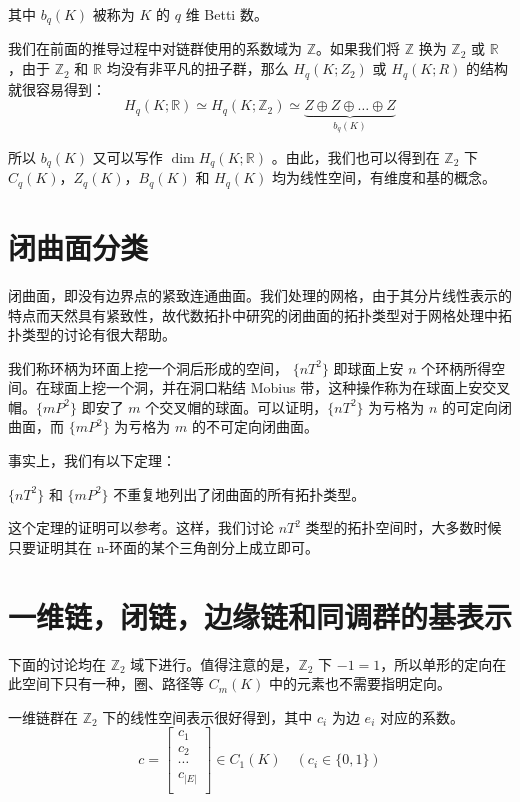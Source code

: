 其中 $ b_q(K) $ 被称为 $ K $ 的 $ q $ 维 Betti 数。

我们在前面的推导过程中对链群使用的系数域为 $ \mathbb Z $。如果我们将 $ \mathbb{Z} $ 换为 $ \mathbb{Z}_2 $ 或 $ \mathbb{R} $，由于 $ \mathbb{Z}_2 $ 和 $ \mathbb{R} $ 均没有非平凡的扭子群，那么 $ H_q(K; Z_2) $ 或 $ H_q(K; R) $ 的结构就很容易得到：
$$
H_q(K;\mathbb{R}) \simeq H_q(K;\mathbb{Z}_2) \simeq\underbrace{Z \oplus Z \oplus \dots \oplus Z}_{b_q(K)}
$$

所以 $ b_q(K) $ 又可以写作 $ \dim H_q(K; \mathbb{R}) $ 。由此，我们也可以得到在 $ \mathbb{Z}_2 $ 下 $ C_q(K) $，$ Z_q(K) $，$ B_q(K) $ 和 $ H_q(K) $ 均为线性空间，有维度和基的概念。

\section{闭曲面分类}

闭曲面，即没有边界点的紧致连通曲面。我们处理的网格，由于其分片线性表示的特点而天然具有紧致性，故代数拓扑中研究的闭曲面的拓扑类型对于网格处理中拓扑类型的讨论有很大帮助。

我们称环柄为环面上挖一个洞后形成的空间， $ \{nT^2\} $ 即球面上安 $ n $ 个环柄所得空间。在球面上挖一个洞，并在洞口粘结 Mobius 带，这种操作称为在球面上安交叉帽。$ \{mP^2\} $ 即安了 $ m $ 个交叉帽的球面。可以证明，$ \{nT^2\} $ 为亏格为 $ n $ 的可定向闭曲面，而 $ \{mP^2\} $ 为亏格为 $ m $ 的不可定向闭曲面。

事实上，我们有以下定理：

\begin{theorem}
    $ \{nT^2 \} $ 和 $ \{mP^2\} $ 不重复地列出了闭曲面的所有拓扑类型。
\end{theorem}

这个定理的证明可以参考\cite{jctpxjy}。这样，我们讨论 $ nT^2 $ 类型的拓扑空间时，大多数时候只要证明其在 n-环面的某个三角剖分上成立即可。

\section{一维链，闭链，边缘链和同调群的基表示}

下面的讨论均在 $ \mathbb{Z}_2 $ 域下进行。值得注意的是，$ \mathbb{Z}_2 $ 下 $ -1 = 1 $，所以单形的定向在此空间下只有一种，圈、路径等 $ C_m(K) $ 中的元素也不需要指明定向。

一维链群在 $ \mathbb{Z}_2 $ 下的线性空间表示很好得到，其中 $ c_i $ 为边 $ e_i $ 对应的系数。
$$
c = \begin{bmatrix}
        c_1 \\
        c_2 \\
        \cdots \\
        c_{|E|} \\
    \end{bmatrix} \in C_1(K) \quad (c_i \in \{0, 1\})
$$

